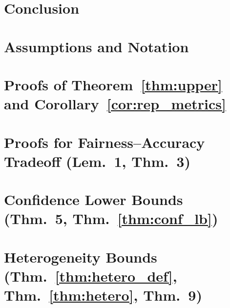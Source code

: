 \documentclass{article}
\begin{document}
\section{Conclusion}



\newpage
\appendix

\section{Assumptions and Notation}\label{app:assump}

\section{Proofs of Theorem~\ref{thm:upper} and Corollary~\ref{cor:rep_metrics}}

\section{Proofs for Fairness--Accuracy Tradeoff (Lem.~1, Thm.~3)}

\section{Confidence Lower Bounds (Thm.~5, Thm.~\ref{thm:conf_lb})}\label{app:conf}

\section{Heterogeneity Bounds (Thm.~\ref{thm:hetero_def}, Thm.~\ref{thm:hetero}, Thm.~9)}
\label{app:hetero}
\end{document}

